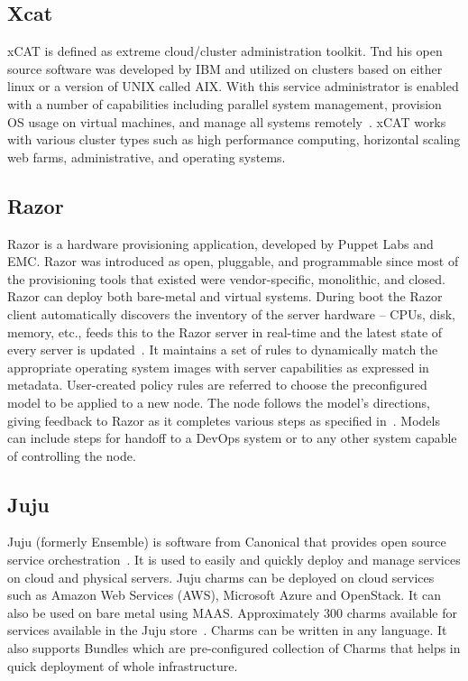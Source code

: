 {\subsection{Xcat}

xCAT is defined as extreme cloud/cluster administration toolkit. Tnd
his open source software was developed by IBM and utilized on clusters
based on either linux or a version of UNIX called AIX. With this
service administrator is enabled with a number of capabilities
including parallel system management, provision OS usage on virtual
machines, and manage all systems remotely~\cite{www-xcat}. xCAT works
with various cluster types such as high performance computing,
horizontal scaling web farms, administrative, and operating
systems.~\cite{www-03ibm}

     \pv
     
\subsection{Razor}

Razor is a hardware provisioning application, developed by Puppet Labs
and EMC. Razor was introduced as open, pluggable, and programmable
since most of the provisioning tools that existed were
vendor-specific, monolithic, and closed. Razor can deploy both
bare-metal and virtual systems. During boot the Razor client
automatically discovers the inventory of the server hardware – CPUs,
disk, memory, etc., feeds this to the Razor server in real-time and
the latest state of every server is updated~\cite{www-RazorWiki}. It
maintains a set of rules to dynamically match the appropriate
operating system images with server capabilities as expressed in
metadata. User-created policy rules are referred to choose the
preconfigured model to be applied to a new node. The node follows the
model's directions, giving feedback to Razor as it completes various
steps as specified in~\cite{www-RazorPuppet}. Models can include steps
for handoff to a DevOps system or to any other system capable of
controlling the node.

     \pv

\subsection{Juju}

Juju (formerly Ensemble) is software from Canonical that provides open
source service orchestration~\cite{juju-paper}.  It is used to easily
and quickly deploy and manage services on cloud and physical
servers. Juju charms can be deployed on cloud services such as Amazon
Web Services (AWS), Microsoft Azure and OpenStack. It can also be used
on bare metal using MAAS.  Approximately 300 charms available for
services available in the Juju store~\cite{www-juju}. Charms can be
written in any language. It also supports Bundles which are
pre-configured collection of Charms that helps in quick deployment of
whole infrastructure.

}
